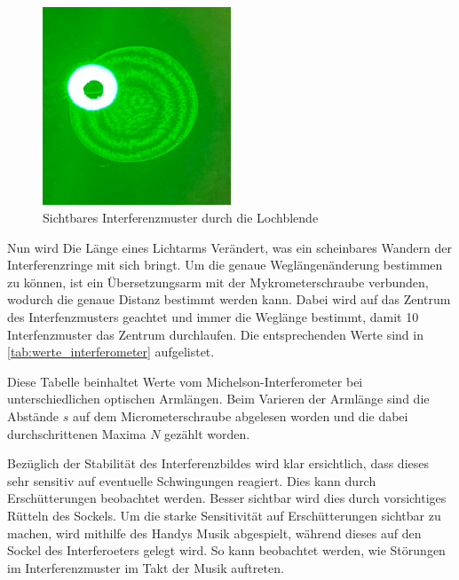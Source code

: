 \documentclass[12pt,english,ngerman]{scrartcl}
\begin{document}
\begin{figure}[H]
	\begin{center}
		\includegraphics[width =0.5\textwidth]{./figures/Blende.JPG}
	\end{center}
	\caption[Sichtbares Interferenzmuster durch die Lochblende] { Sichtbares
		Interferenzmuster durch die Lochblende
	}\label{fig:beugungsbild_lochblende}
\end{figure}

Nun wird Die Länge eines Lichtarms Verändert, was ein scheinbares Wandern der
Interferenzringe mit sich bringt. Um die genaue Weglängenänderung bestimmen zu
können, ist ein Übersetzungsarm mit der Mykrometerschraube verbunden, wodurch
die genaue Distanz bestimmt werden kann. Dabei wird auf das Zentrum des
Interfenzmusters geachtet und immer die Weglänge bestimmt, damit 10
Interfenzmuster das Zentrum durchlaufen. Die entsprechenden Werte sind in
\autoref{tab:werte_interferometer} aufgelistet.

\begin{table}[H]
	\caption{Diese Tabelle beinhaltet Werte vom Michelson-Interferometer bei
  unterschiedlichen optischen Armlängen. Beim Varieren der Armlänge sind die Abstände 
$s$ auf dem Micrometerschraube abgelesen worden und die dabei durchschrittenen Maxima 
$N$ gezählt worden.}\label{tab:werte_interferometer}
	\centering
	
\end{table}

Bezüglich der Stabilität des Interferenzbildes wird klar ersichtlich, dass
dieses sehr sensitiv auf eventuelle Schwingungen reagiert. Dies kann durch
Erschütterungen beobachtet werden. Besser sichtbar wird dies durch vorsichtiges
Rütteln des Sockels. Um die starke Sensitivität auf Erschütterungen sichtbar zu
machen, wird mithilfe des Handys Musik abgespielt, während dieses auf den
Sockel des Interferoeters gelegt wird. So kann beobachtet werden, wie Störungen
im Interferenzmuster im Takt der Musik auftreten.
\end{document}
